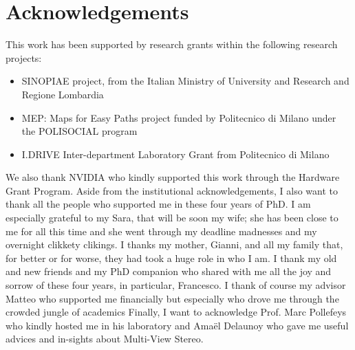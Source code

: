  \chapter*{Acknowledgements}
 
 This work has been supported by research grants within the following research projects:
\begin{itemize}
 \item[] SINOPIAE project, from the Italian Ministry of University and Research and Regione Lombardia
 \item[] MEP: Maps for Easy Paths project funded by Politecnico di Milano under the POLISOCIAL program
 \item[] I.DRIVE Inter-department Laboratory Grant from Politecnico di Milano
\end{itemize}
We also thank NVIDIA who kindly supported this work through the Hardware Grant Program.
\bigskip 
Aside from the institutional acknowledgements, I also want to thank all the people who supported me in these four years of PhD. 
I am especially grateful to my Sara, that will be soon my wife; she has been close to me for all this time and she went through my deadline madnesses and my overnight clikkety clikings.
I thanks my mother,  Gianni, and all my family that, for better or for worse, they had took a huge role in who I am.
I thank my old and new friends and my PhD companion who shared with me all the joy and sorrow of these four years, in particular, Francesco.  
I thank of course my advisor Matteo who supported me financially but especially who drove me through the crowded jungle of academics
Finally, I want to acknowledge Prof. Marc Pollefeys who kindly hosted me in his laboratory and Amaël Delaunoy who gave me useful advices and in-sights about Multi-View Stereo.

